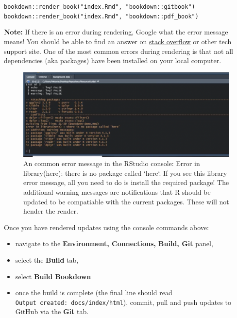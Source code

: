 \documentclass[
]{book}
\providecommand{\tightlist}{%
  \setlength{\itemsep}{0pt}\setlength{\parskip}{0pt}}
\begin{document}
\texttt{bookdown::render\_book("index.Rmd",\ "bookdown::gitbook")}
\texttt{bookdown::render\_book("index.Rmd",\ "bookdown::pdf\_book")}

\textbf{Note:} If there is an error during rendering, Google what the error message means! You should be able to find an answer on \href{https://stackoverflow.com/}{stack overflow} or other tech support site. One of the most common errors during rendering is that not all dependencies (aka packages) have been installed on your local computer.

\begin{figure}

{\centering \includegraphics[width=0.95\linewidth]{images/bookdown_here} 

}

\caption{An common error message in the RStudio console: Error in library(here): there is no package called `here`. If you see this library error message, all you need to do is install the required package! The additional warning messages are notifications that R should be updated to be compatiable with the current packages. These will not hender the render.}\label{fig:rendererror}
\end{figure}

Once you have rendered updates using the console commands above:

\begin{itemize}
\tightlist
\item
  navigate to the \textbf{Environment, Connections, Build, Git} panel,
\item
  select the \textbf{Build} tab,
\item
  select \textbf{Build Bookdown}
\item
  once the build is complete (the final line should read \texttt{Output\ created:\ docs/index/html}), commit, pull and push updates to GitHub via the \textbf{Git} tab.
\end{itemize}
\end{document}
